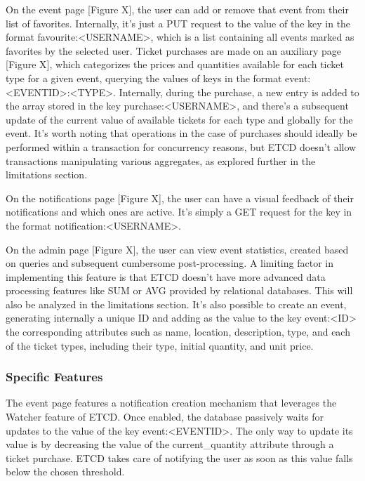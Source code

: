 \documentclass[screen,review]{acmart}
\begin{document}
On the event page [Figure X], the user can add or remove that event from their list of favorites. Internally, it's just a PUT request to the value of the key in the format favourite:<USERNAME>, which is a list containing all events marked as favorites by the selected user. Ticket purchases are made on an auxiliary page [Figure X], which categorizes the prices and quantities available for each ticket type for a given event, querying the values of keys in the format event:<EVENTID>:<TYPE>. Internally, during the purchase, a new entry is added to the array stored in the key purchase:<USERNAME>, and there's a subsequent update of the current value of available tickets for each type and globally for the event. It's worth noting that operations in the case of purchases should ideally be performed within a transaction for concurrency reasons, but ETCD doesn't allow transactions manipulating various aggregates, as explored further in the limitations section.

On the notifications page [Figure X], the user can have a visual feedback of their notifications and which ones are active. It's simply a GET request for the key in the format notification:<USERNAME>.

On the admin page [Figure X], the user can view event statistics, created based on queries and subsequent cumbersome post-processing. A limiting factor in implementing this feature is that ETCD doesn't have more advanced data processing features like SUM or AVG provided by relational databases. This will also be analyzed in the limitations section. It's also possible to create an event, generating internally a unique ID and adding as the value to the key event:<ID> the corresponding attributes such as name, location, description, type, and each of the ticket types, including their type, initial quantity, and unit price.

\subsubsection{Specific Features}

The event page features a notification creation mechanism that leverages the Watcher feature of ETCD. Once enabled, the database passively waits for updates to the value of the key event:<EVENTID>. The only way to update its value is by decreasing the value of the current_quantity attribute through a ticket purchase. ETCD takes care of notifying the user as soon as this value falls below the chosen threshold.
\end{document}
